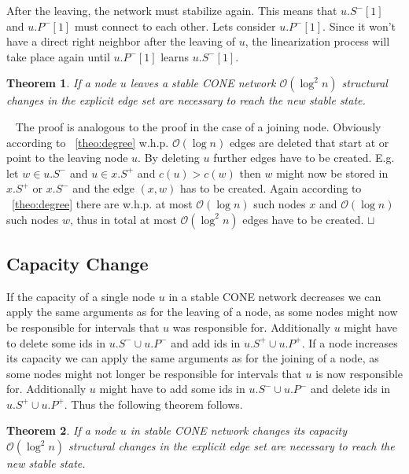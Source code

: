 \documentclass[11pt]{article}
\newtheorem{theorem}{Theorem}[section]
\newcommand{\sq}{\hbox{\rlap{$\sqcap$}$\sqcup$}}
\newcommand{\qed}{\hspace*{\fill}\sq}
\newenvironment{proof}{\noindent {\bf Proof.}\ }{\qed\par\vskip 4mm\par}
\begin{document}
After the leaving, the network must stabilize again.
This means that $u.S^-[1]$ and $u.P^-[1]$ must connect to each other. Lets consider $u.P^-[1]$. Since it won't have a direct right neighbor after the leaving of $u$, the linearization process will take place again until $u.P^-[1]$ learns $u.S^-[1]$.

\begin{theorem}
If a node $u$ leaves a stable CONE network $\mathcal O(\log^2 n)$ structural changes in the explicit edge set are necessary to reach the new stable state.
\end{theorem}

\begin{proof}
The proof is analogous to the proof in the case of a joining node. Obviously according to ~\ref{theo:degree} w.h.p. $\mathcal O(\log n)$ edges are deleted that start at or point to the leaving node $u$. By deleting $u$ further edges have to be created. E.g. let $w\in u.S^-$ and $u \in x.S^+$ and $c(u)>c(w)$ then $w$ might now be stored in $x.S^+$ or $x.S^-$ and the edge $(x,w)$ has to be created. Again according to ~\ref{theo:degree} there are w.h.p. at most $\mathcal O(\log n)$ such nodes $x$ and  $\mathcal O(\log n)$ such nodes $w$, thus in total at most $\mathcal O(\log^2 n)$ edges have to be created.
\end{proof}





\subsection{Capacity Change}
If the capacity of a single node $u$ in a stable CONE network decreases we can apply the same arguments as for the leaving of a node, as some nodes might now be responsible for intervals that $u$ was responsible for. Additionally $u$ might have to delete some ids in $u.S^- \cup u.P^-$ and add ids in $u.S^+ \cup u.P^+$. If a node increases its capacity we can apply the same arguments as for the joining of a node, as some nodes might not longer be responsible for intervals that $u$ is now responsible for. Additionally $u$ might have to add some ids in $u.S^- \cup u.P^-$ and delete ids in $u.S^+ \cup u.P^+$. Thus the following theorem follows.

\begin{theorem}
If a node $u$ in stable CONE network changes its capacity $\mathcal O(\log^2 n)$ structural changes in the explicit edge set are necessary to reach the new stable state.
\end{theorem}
\end{document}
